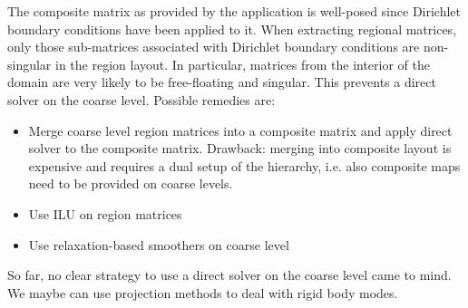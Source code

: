 \documentclass[11pt]{article}
\begin{document}
The composite matrix as provided by the application is well-posed since Dirichlet boundary conditions have been applied to it.
When extracting regional matrices, only those sub-matrices associated with Dirichlet boundary conditions are non-singular
in the region layout. In particular, matrices from the interior of the domain are very likely to be free-floating and singular.
This prevents a direct solver on the coarse level. Possible remedies are:
\begin{itemize}
\item Merge coarse level region matrices into a composite matrix and apply direct solver to the composite matrix.
Drawback: merging into composite layout is expensive and requires a dual setup of the hierarchy,
i.e. also composite maps need to be provided on coarse levels.
\item Use ILU on region matrices
\item Use relaxation-based smoothers on coarse level
\end{itemize}
So far, no clear strategy to use a direct solver on the coarse level came to mind.
We maybe can use projection methods to deal with rigid body modes.
\end{document}
